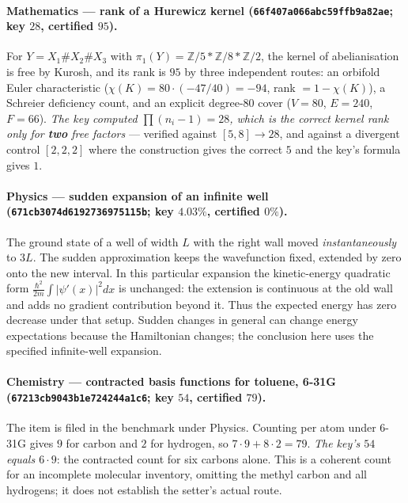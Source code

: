 \documentclass[11pt,a4paper]{article}
\theoremstyle{remark}
\begin{document}
\paragraph{Mathematics --- rank of a Hurewicz kernel ({\small\texttt{66f407a066abc59ffb9a82ae}}; key $28$, certified $95$).}
For $Y = X_1 \# X_2 \# X_3$ with $\pi_1(Y) = \mathbb{Z}/5 * \mathbb{Z}/8 * \mathbb{Z}/2$, the kernel of
abelianisation is free by Kurosh, and its rank is $95$ by three independent routes: an orbifold Euler
characteristic ($\chi(K) = 80\cdot(-47/40) = -94$, rank $= 1 - \chi(K)$), a Schreier deficiency count,
and an explicit degree-$80$ cover ($V=80$, $E=240$, $F=66$). \emph{The key computed
$\prod(n_i - 1) = 28$, which is the correct kernel rank only for \textbf{two} free factors} --- verified
against $[5,8] \rightarrow 28$, and against a divergent control $[2,2,2]$ where the construction gives
the correct $5$ and the key's formula gives $1$.

\paragraph{Physics --- sudden expansion of an infinite well ({\small\texttt{671cb3074d6192736975115b}}; key $4.03\%$, certified $0\%$).}
The ground state of a well of width $L$ with the right wall moved \emph{instantaneously} to $3L$. The sudden approximation keeps the wavefunction fixed, extended by zero onto the new interval. In this particular expansion the kinetic-energy quadratic form $\frac{\hbar^2}{2m}\int|\psi'(x)|^2dx$ is unchanged: the extension is continuous at the old wall and adds no gradient contribution beyond it. Thus the expected energy has zero decrease under that setup. Sudden changes in general can change energy expectations because the Hamiltonian changes; the conclusion here uses the specified infinite-well expansion.

\paragraph{Chemistry --- contracted basis functions for toluene, 6-31G ({\small\texttt{67213cb9043b1e724244a1c6}}; key $54$, certified $79$).}
The item is filed in the benchmark under Physics. Counting per atom under 6-31G gives $9$ for carbon
and $2$ for hydrogen, so $7\cdot 9 + 8\cdot 2 = 79$. \emph{The key's $54$ equals $6\cdot9$}: the contracted count for six carbons alone. This is a coherent count for an incomplete molecular inventory, omitting the methyl carbon and all hydrogens; it does not establish the setter's actual route.
\end{document}
